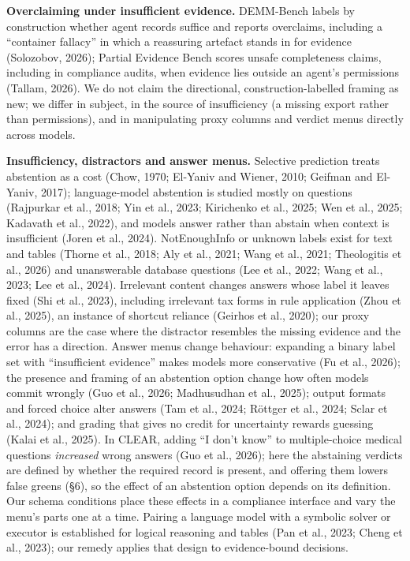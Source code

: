 \documentclass[10pt,twocolumn]{article}
\begin{document}
\textbf{Overclaiming under insufficient evidence.} DEMM-Bench labels by construction whether agent records suffice and reports overclaims, including a ``container fallacy'' in which a reassuring artefact stands in for evidence (Solozobov, 2026); Partial Evidence Bench scores unsafe completeness claims, including in compliance audits, when evidence lies outside an agent's permissions (Tallam, 2026). We do not claim the directional, construction-labelled framing as new; we differ in subject, in the source of insufficiency (a missing export rather than permissions), and in manipulating proxy columns and verdict menus directly across models.

\textbf{Insufficiency, distractors and answer menus.} Selective prediction treats abstention as a cost (Chow, 1970; El-Yaniv and Wiener, 2010; Geifman and El-Yaniv, 2017); language-model abstention is studied mostly on questions (Rajpurkar et al., 2018; Yin et al., 2023; Kirichenko et al., 2025; Wen et al., 2025; Kadavath et al., 2022), and models answer rather than abstain when context is insufficient (Joren et al., 2024). NotEnoughInfo or unknown labels exist for text and tables (Thorne et al., 2018; Aly et al., 2021; Wang et al., 2021; Theologitis et al., 2026) and unanswerable database questions (Lee et al., 2022; Wang et al., 2023; Lee et al., 2024). Irrelevant content changes answers whose label it leaves fixed (Shi et al., 2023), including irrelevant tax forms in rule application (Zhou et al., 2025), an instance of shortcut reliance (Geirhos et al., 2020); our proxy columns are the case where the distractor resembles the missing evidence and the error has a direction. Answer menus change behaviour: expanding a binary label set with ``insufficient evidence'' makes models more conservative (Fu et al., 2026); the presence and framing of an abstention option change how often models commit wrongly (Guo et al., 2026; Madhusudhan et al., 2025); output formats and forced choice alter answers (Tam et al., 2024; Röttger et al., 2024; Sclar et al., 2024); and grading that gives no credit for uncertainty rewards guessing (Kalai et al., 2025). In CLEAR, adding ``I don't know'' to multiple-choice medical questions \emph{increased} wrong answers (Guo et al., 2026); here the abstaining verdicts are defined by whether the required record is present, and offering them lowers false greens (§6), so the effect of an abstention option depends on its definition. Our schema conditions place these effects in a compliance interface and vary the menu's parts one at a time. Pairing a language model with a symbolic solver or executor is established for logical reasoning and tables (Pan et al., 2023; Cheng et al., 2023); our remedy applies that design to evidence-bound decisions.
\end{document}
